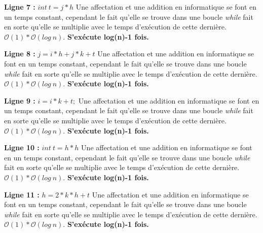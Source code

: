 \documentclass[12pt]{article}
\begin{document}
        \noindent \textbf{Ligne 7 :} \( int \: t = j*h \) \newline
        Une affectation et une addition en informatique se font en un temps constant, cependant le fait qu'elle se trouve dans une boucle \textit{while} fait en sorte qu'elle se multiplie avec le temps d'exécution de cette dernière.
        \( \mathcal{O}(1)*\mathcal{O}(log \: n) \). \newline
		\textbf{S'exécute log(n)-1 fois.} \newline

        \noindent \textbf{Ligne 8 :} \( j = i*h + j*k + t \) \newline
  	    Une affectation et une addition en informatique se font en un temps constant, cependant le fait qu'elle se trouve dans une boucle \textit{while} fait en sorte qu'elle se multiplie avec le temps d'exécution de cette dernière.   
        \( \mathcal{O}(1)*\mathcal{O}(log \: n) \). \newline
 		\textbf{S'exécute log(n)-1 fois.} \newline  
    
        \noindent \textbf{Ligne 9 :} \( i = i*k + t; \) \newline
  	    Une affectation et une addition en informatique se font en un temps constant, cependant le fait qu'elle se trouve dans une boucle \textit{while} fait en sorte qu'elle se multiplie avec le temps d'exécution de cette dernière.
        \( \mathcal{O}(1)*\mathcal{O}(log \: n) \). \newline
		\textbf{S'exécute log(n)-1 fois.} \newline      
        
        \noindent \textbf{Ligne 10 :} \( int \: t = h*h \) \newline
  	    Une affectation et une addition en informatique se font en un temps constant, cependant le fait qu'elle se trouve dans une boucle \textit{while} fait en sorte qu'elle se multiplie avec le temps d'exécution de cette dernière.
        \( \mathcal{O}(1)*\mathcal{O}(log \: n) \). \newline
        \textbf{S'exécute log(n)-1 fois.} \newline
        
        \noindent \textbf{Ligne 11 :} \( h = 2*k*h + t \) \newline
  	    Une affectation et une addition en informatique se font en un temps constant, cependant le fait qu'elle se trouve dans une boucle \textit{while} fait en sorte qu'elle se multiplie avec le temps d'exécution de cette dernière.
        \( \mathcal{O}(1)*\mathcal{O}(log \: n) \). \newline
        \textbf{S'exécute log(n)-1 fois.} \newline
        
\end{document}

